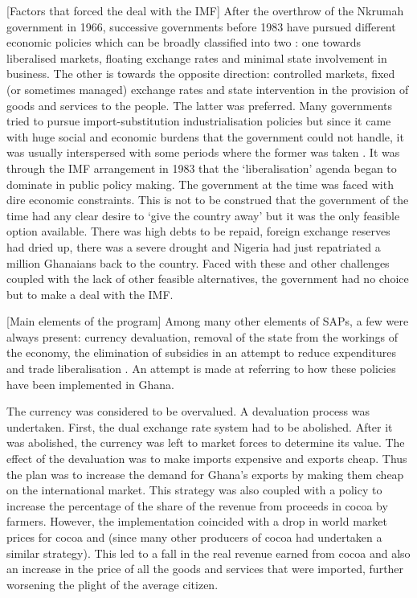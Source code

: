 \documentclass[a4paper, 12pt]{article}
\begin{document}
	[Factors that forced the deal with the IMF]
	After the overthrow of the Nkrumah government in 1966, successive governments before 1983 have pursued different economic policies which can be broadly classified into two : one towards liberalised markets, floating exchange rates and minimal state involvement in business. The other is towards the opposite direction: controlled markets, fixed (or sometimes managed) exchange rates and state intervention in the provision of goods and services to the people. The latter was preferred. Many governments tried to pursue import-substitution industrialisation policies but since it came with huge social and economic burdens that the government could not handle, it was usually interspersed with some periods where the former was taken \cite{hutchful1989revolution}. It was through the IMF arrangement in 1983 that the `liberalisation' agenda began to dominate in public policy making. The government at the time was faced with dire economic constraints. This is not to be construed that the government of the time had any clear desire to `give the country away' but it was the only feasible option available. There was high debts to be repaid, foreign exchange reserves had dried up, there was a severe drought and Nigeria had just repatriated a million Ghanaians back to the country. Faced with these and other challenges coupled with the lack of other feasible alternatives, the government had no choice but to make a deal with the IMF. 
	
	
	[Main elements of the program]
	Among many other elements of SAPs, a few were always present: currency devaluation, removal of the state from the workings of the economy, the elimination of subsidies in an attempt to reduce expenditures and trade liberalisation \cite{ThingsFallAp}. An attempt is made at referring to how these policies have been implemented in Ghana.
	
	The currency was considered to be overvalued. A devaluation process was undertaken. First, the dual exchange rate system had to be abolished. After it was abolished, the currency was left to market forces to determine its value. The effect of the devaluation was to make imports expensive and exports cheap. Thus the plan was to increase the demand for Ghana's exports by making them cheap on the international market. This strategy was also coupled with a policy to increase the percentage of the share of the revenue from proceeds in cocoa by farmers. However, the implementation coincided with a drop in world market prices for cocoa and (since many other producers of cocoa had undertaken a similar strategy). This led to a fall in the real revenue earned from cocoa and also an increase in the price of all the goods and services that were imported, further worsening the plight of the average citizen. 
	
\end{document}

